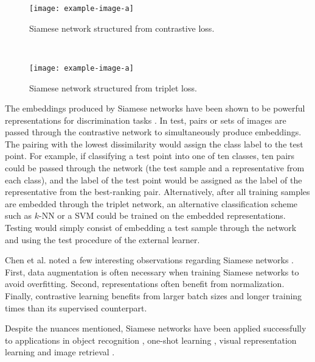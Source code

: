		
		\begin{figure*}[h!]
			\hfill
			\begin{subfigure}[t]{0.5\textwidth}
				\texttt{[image: example-image-a]}
				\caption{Siamese network structured from contrastive loss.}
				\label{fig:siamese_networks_conrastive}
			\end{subfigure}%
			\centering
			~ 
			\begin{subfigure}[t]{0.5\textwidth}
				\centering
				\texttt{[image: example-image-a]}
				\caption{Siamese network structured from triplet loss.}
				\label{fig:siamese_networks_triplet}
			\end{subfigure}
		
			\caption[Siamese Neural Networks]{ }
			\label{fig:siamese_networks}%
		\end{figure*}
	
	
		The embeddings produced by Siamese networks have  been shown to be powerful representations for discrimination tasks \citep{Chen2020ContrastiveLearning, Schroff2015FaceNet, Koch2015SiameseNetworks}.  In test, pairs or sets of images are passed through the contrastive network to simultaneously produce embeddings.  The pairing with the lowest dissimilarity would assign the class label to the test point.  For example, if classifying a test point into one of ten classes, ten pairs could be passed through the network (the test sample and a representative from each class), and the label of the test point would be assigned as the label of the representative from the best-ranking pair.   Alternatively, after all training samples are embedded through the triplet network, an alternative classification scheme such as $k$-NN or a SVM could be trained on the embedded representations.  Testing would simply consist of embedding a test sample through the network and using the test procedure of the external learner.
		
		
		Chen et al. noted a few interesting observations regarding Siamese networks \citep{Chen2020ContrastiveLearning}. First, data augmentation is often necessary when training Siamese networks to avoid overfitting.  Second, representations often benefit from normalization. Finally, contrastive learning benefits from larger batch sizes and longer training times than its supervised counterpart.
		
		Despite the nuances mentioned, Siamese networks have been applied  successfully to applications in object recognition \citep{Hoffer2015DeepMetricLearning}, one-shot learning \citep{Koch2015SiameseNetworks}, visual representation learning \citep{Chen2020ContrastiveLearning} and image retrieval \citep{Hoffer2015DeepMetricLearning}.
		
